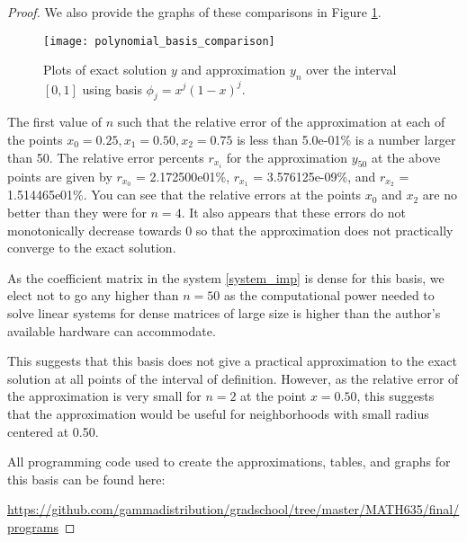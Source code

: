 \begin{proof}
  We also provide the graphs of these comparisons in Figure \ref{poly_plot}.

  \begin{figure}[h!]
    \begin{center}
      \texttt{[image: polynomial\_basis\_comparison]}
    \end{center}
    \caption{Plots of exact solution $y$ and approximation $y_n$ over the interval $[0, 1]$
       using basis $\phi_j = x^j(1-x)^j$.}\label{poly_plot}
  \end{figure}

  The first value of $n$ such that the relative error of the approximation at
  each of the points $x_0=0.25, x_1=0.50, x_2=0.75$ is less than 5.0e-01\% is a number larger than 50.
  The relative error percents $r_{x_i}$ for the approximation $y_{50}$ at the above points are given by $r_{x_0}$ = 2.172500e01\%,
  $r_{x_1}$ = 3.576125e-09\%, and $r_{x_2}$ = 1.514465e01\%. You can see that the relative errors at the points $x_0$ and $x_2$ are no
  better than they were for $n=4$. It also appears that these errors do not monotonically decrease towards 0 so that the
  approximation does not practically converge to the exact solution.

  As the coefficient matrix in the system \eqref{system_imp} is dense for this basis,
  we elect not to go any higher than $n=50$ as the computational power needed to solve
  linear systems for dense matrices of large size is higher than
  the author's available hardware can accommodate.

  This suggests that this basis does not give a practical
  approximation to the exact solution at all points of the interval of definition.
  However, as the relative error of the approximation is very small for $n=2$
  at the point $x=0.50$, this suggests that the approximation would be useful
  for neighborhoods with small radius centered at 0.50.

  All programming code used to create the approximations, tables, and graphs
  for this basis can be found here:

  \url{https://github.com/gammadistribution/gradschool/tree/master/MATH635/final/programs}
\end{proof}